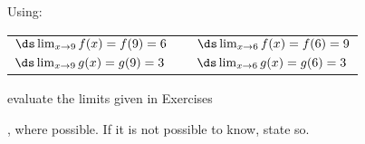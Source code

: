 {\noindent Using:

\begin{tabular}{lll}
$\ds \lim_{x\to9}f(x) = f(9) = 6$ & \quad\quad &$\ds \lim_{x\to6} f(x) = f(6) = 9$\\
$\ds \lim_{x\to9}g(x) = g(9) = 3$ &  & $\ds \lim_{x\to6} g(x) = g(6) = 3$
\end{tabular}

\noindent evaluate the limits given in Exercises}
{, where possible. If it is not possible to know, state so.}
